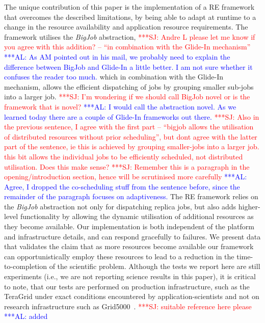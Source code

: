 \documentclass{rspublic}
\newcommand{\alnote}[1]{ {\textcolor{blue} { ***AL: #1 }}}
\newcommand{\jhanote}[1]{ {\textcolor{red} { ***SJ: #1 }}}
\newcommand{\alnote}[1]{}
\newcommand{\jhanote}[1]{}
\begin{document}
The unique contribution of this paper is the implementation of a RE
framework that overcomes the described limitations, by being able to
adapt at runtime to a change in the resource availability and
application resource requirements. The framework utilises the
\emph{BigJob} abstraction, \jhanote{Andre L please let me know if you
  agree with this addition? -- ``in combination with the Glide-In
  mechanism''} \alnote{As AM pointed out in his mail, we probably
  need to explain the difference between BigJob and Glide-In a little
  better. I am not sure whether it confuses the reader too much.}
  which in combination with the Glide-In mechanism,
allows the efficient dispatching of jobs by grouping smaller sub-jobs
into a larger job. \jhanote{I'm wondering if we should call BigJob
  novel or is the framework that is
  novel?}  
\alnote{I would call the abstraction novel. As we learned today there
are a couple of Glide-In frameworks out there.} 
\jhanote{Also in the previous sentence, I agree with the first part --
  ``bigjob allows the utilisation of distributed resources without
  prior scheduling'', but dont agree with the latter part of the
  sentence, ie this is achieved by grouping smaller-jobs into a larger
  job. this bit allows the individual jobs to be efficiently
  scheduled, not distributed utilisation. Does this make sense?}
\jhanote{Remember this is a paragraph in the opening/introduction
  section, hence will be scrutinised more carefully} \alnote{Agree, I
  dropped the co-scheduling stuff from the sentence before, since the
  remainder of the paragraph focuses on adaptiveness.}  The RE
framework relies on the \emph{BigJob} abstraction not only for
dispatching replica jobs, but also adds higher-level functionality by
allowing the dynamic utilisation of additional resources as they
become available.  Our implementation is both independent of the
platform and infrastructure details, and can respond gracefully to
failures.  We present data that validates the claim that as more
resources become available our framework can opportunistically employ
these resources to lead to a reduction in the time-to-completion of
the scientific problem.  Although the tests we report here are still
experiments (i.e., we are not reporting science results in this
paper), it is critical to note, that our tests are performed on
production infrastructure, such as the TeraGrid under exact conditions
encountered by application-scientists and not on research
infrastructure such as Grid5000~\citep{iosup07}.  \jhanote{suitable
  reference here please}\alnote{added}
\end{document}
